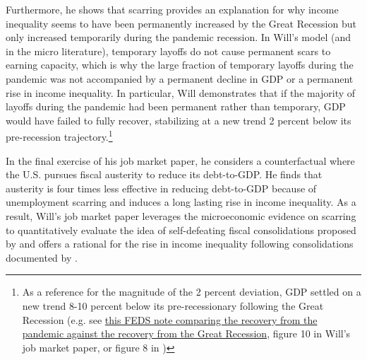 \documentclass[\econtexRoot/Letter]{subfiles}
\begin{document}
Furthermore, he shows that scarring provides an explanation for why income inequality seems to have been permanently increased by the Great Recession but only increased temporarily during the pandemic recession. In Will's model (and in the micro literature), temporary layoffs do not cause permanent scars to earning capacity, which is why the large fraction of temporary layoffs during the pandemic was not accompanied by a permanent decline in GDP or a permanent rise in income inequality. In particular, Will demonstrates that if the majority of layoffs during the pandemic had been permanent rather than temporary, GDP would have failed to fully recover, stabilizing at a new trend 2 percent below its pre-recession trajectory.\footnote{As a reference for the magnitude of the 2 percent deviation, GDP settled on a new trend 8-10 percent below its pre-recessionary following the Great Recession (e.g. see \href{https://www.federalreserve.gov/econres/notes/feds-notes/why-is-the-u-s-gdp-recovering-faster-than-other-advanced-economies-20240517.html}{this FEDS note comparing the recovery from the pandemic against the recovery from the Great Recession}, figure 10 in Will's job market paper, or figure 8 in \cite{Christiano2015})}


In the final exercise of his job market paper, he considers a counterfactual where the U.S. pursues fiscal austerity to reduce its debt-to-GDP. He finds that austerity is four times less effective in reducing debt-to-GDP because of unemployment scarring and induces a long lasting rise in income inequality. As a result, Will's job market paper leverages the microeconomic evidence on scarring to quantitatively evaluate the idea of self-defeating fiscal consolidations proposed by \cite{FatasSummers2018} and offers a rational for the rise in income inequality following consolidations documented by \cite{Ball2013}. 
\end{document}
